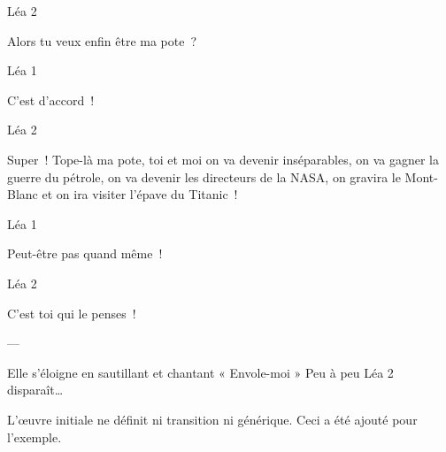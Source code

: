 \documentclass{frscenario}
\begin{document}
\— Léa 2

Alors tu veux enfin être ma pote ?

\— Léa 1

C’est d’accord !

\— Léa 2

Super ! Tope-là ma pote, toi et moi on va devenir inséparables, on va gagner la guerre du pétrole, on va devenir les directeurs de la NASA, on gravira le Mont-Blanc et on ira visiter l’épave du Titanic !

\— Léa 1

Peut-être pas quand même !

\— Léa 2

C’est toi qui le penses !

\——

Elle s’éloigne en sautillant et chantant « Envole-moi » Peu à peu Léa 2 disparaît…


\Generique

L'œuvre initiale ne définit ni transition ni générique. Ceci a été ajouté pour l'exemple.
\end{document}
